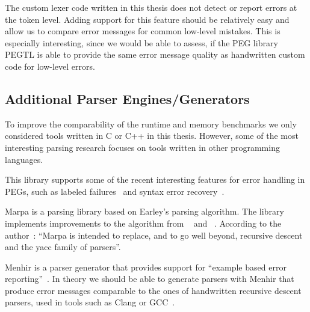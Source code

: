 The custom lexer code written in this thesis does not detect or report errors at the \gls{token} level. Adding support for this feature should be relatively easy and allow us to compare error messages for common low-level mistakes. This is especially interesting, since we would be able to assess, if the PEG library \gls{PEGTL} is able to provide the same error message quality as handwritten custom code for low-level errors.

\subsection{Additional Parser Engines/Generators}

To improve the comparability of the runtime and memory benchmarks we only considered tools written in C or C++ in this thesis. However, some of the most interesting parsing research focuses on tools written in other programming languages.

\begin{description}[style=multiline, leftmargin=3cm, font=\bfseries]
  \item[LPegLabel (Lua)] This library supports some of the recent interesting features for error handling in \glspl{PEG}, such as labeled failures~\cite{maidl2016labeled} and syntax error recovery~\cite{medeiros2018recovery}.

  \item[Marpa (Perl)] Marpa is a parsing library based on Earley’s parsing algorithm. The library implements improvements to the algorithm from \citeauthor{leo1991general}~\cite{leo1991general} and \citeauthor{aycock2002practical}~\cite{aycock2002practical}. According to the author~\cite{kegler2019marpa}: “Marpa is intended to replace, and to go well beyond, recursive descent and the yacc family of parsers”.

  \item [Menhir (OCaml)] Menhir is a  parser generator that provides support for “example based error reporting”~\cite{jeffery2003generating, kaestner2018compcert, pottier2019menhir}. In theory we should be able to generate parsers with Menhir that produce error messages comparable to the ones of handwritten recursive descent parsers, used in tools such as Clang or GCC~\cite[p. 2]{kaestner2018compcert}.
\end{description}
